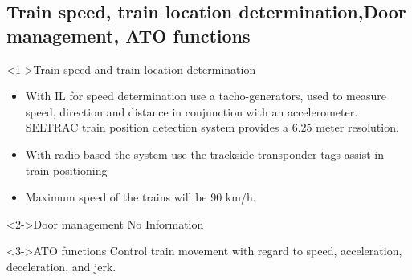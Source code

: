 
\subsection{Train speed, train location determination,Door management, ATO functions}
\frame
{
   \begin{block}<1->{Train speed and train location determination}
      \begin{itemize}
       \item With IL for speed determination use a tacho-generators, used to measure speed, direction and distance in conjunction with an accelerometer. SELTRAC train position detection system provides a 6.25 meter resolution.

\item With radio-based the system use the trackside transponder tags assist in train positioning

\item Maximum speed of the trains will be 90 km/h.

\end{itemize}



   \end{block}


\begin{block}<2->{Door management}
No Information

   \end{block}
   
   \begin{block}<3->{ATO functions}
  Control train movement with regard to speed, acceleration, deceleration, and jerk.
   \end{block}
   
   }



